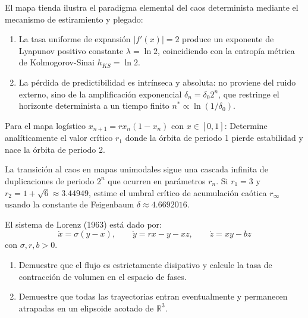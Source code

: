 \documentclass[11pt,a4paper]{article}
\newenvironment{conclusion}[1][Interpretación Dinámica y Conclusión]{%
    \vspace{2mm}%
    \noindent{\large\textbf{Conclusión:}}\par\vspace{1.5mm}%
}{%
    \par\vspace{3mm}%
}
\begin{document}
\begin{conclusion}
El mapa tienda ilustra el paradigma elemental del caos determinista mediante el mecanismo de estiramiento y plegado:
\begin{enumerate}
    \item La tasa uniforme de expansión $|f'(x)| = 2$ produce un exponente de Lyapunov positivo constante $\lambda = \ln 2$, coincidiendo con la entropía métrica de Kolmogorov-Sinai $h_{KS} = \ln 2$.
    \item La pérdida de predictibilidad es intrínseca y absoluta: no proviene del ruido externo, sino de la amplificación exponencial $\delta_n = \delta_0 2^n$, que restringe el horizonte determinista a un tiempo finito $n^* \propto \ln(1/\delta_0)$.
\end{enumerate}
\end{conclusion}

\vspace{3mm}

\begin{problema}[Problema 4.2]
Para el mapa logístico $x_{n+1} = r x_n(1 - x_n)$ con $x \in [0, 1]$:
Determine analíticamente el valor crítico $r_1$ donde la órbita de periodo 1 pierde estabilidad y nace la órbita de periodo 2.
\end{problema}

\vspace{5mm}

\begin{problema}[Problema 4.3]
La transición al caos en mapas unimodales sigue una cascada infinita de duplicaciones de periodo $2^n$ que ocurren en parámetros $r_n$. Si $r_1 = 3$ y $r_2 = 1 + \sqrt{6} \approx 3.44949$, estime el umbral crítico de acumulación caótica $r_\infty$ usando la constante de Feigenbaum $\delta \approx 4.6692016$.
\end{problema}

\vspace{5mm}

\begin{problema}[Problema 4.4]
El sistema de Lorenz (1963) está dado por:
\[
\dot{x} = \sigma(y - x), \qquad \dot{y} = r x - y - x z, \qquad \dot{z} = x y - b z
\]
con $\sigma, r, b > 0$.
\begin{enumerate}[label=\textbf{\alph*)}]
    \item Demuestre que el flujo es estrictamente disipativo y calcule la tasa de contracción de volumen en el espacio de fases.
    \item Demuestre que todas las trayectorias entran eventualmente y permanecen atrapadas en un elipsoide acotado de $\mathbb{R}^3$.
\end{enumerate}
\end{problema}
\end{document}
